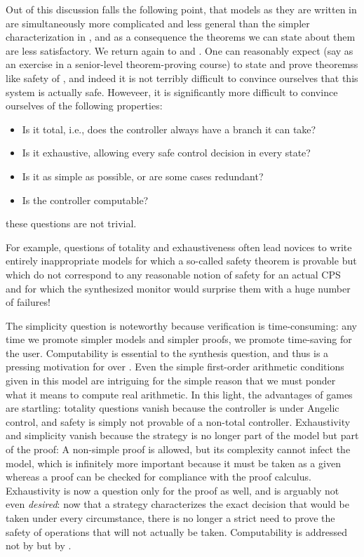 Out of this discussion falls the following point, that models as they are written in \dL are simultaneously more complicated and less general than the simpler characterization in \dGL, and as a consequence the theorems we can state about them are less satisfactory.
We return again to  and .
One can reasonably expect (say as an exercise in a senior-level theorem-proving course) to state and prove theoremss like safety of , and indeed it is not terribly difficult to convince ourselves that this system is actually safe.
Howeveer, it is significantly more difficult to convince ourselves of the following properties:
\begin{itemize}
\item Is it total, i.e., does the controller always have a branch it can take?
\item Is it exhaustive, allowing every safe control decision in every state?
\item Is it as simple as possible, or are some cases redundant?
\item Is the controller computable?
\end{itemize}
these questions are not trivial.


For example, questions of totality and exhaustiveness often lead novices to write entirely inappropriate models for which a so-called safety theorem is provable but which do not correspond to any reasonable notion of safety for an actual CPS and for which the synthesized \VeriPhy monitor would surprise them with a huge number of failures!


The simplicity question is noteworthy because verification is time-consuming: any time we promote simpler models and simpler proofs, we promote time-saving for the user.
Computability is essential to the synthesis question, and thus is a pressing motivation for \CdGL over \dGL.
Even the simple first-order arithmetic conditions given in this model are intriguing for the simple reason that we must ponder what it means to compute real arithmetic.
In this light, the advantages of games are startling: totality questions vanish because the controller is under Angelic control, and safety is simply not provable of a non-total controller.
Exhaustivity and simplicity vanish because the strategy is no longer part of the model but part of the proof: A non-simple proof is allowed, but its complexity cannot infect the model, which is infinitely more important because it must be taken as a given whereas a proof can be checked for compliance with the proof calculus.
Exhaustivity is now a question only for the proof as well, and is arguably not even \emph{desired}: now that a strategy characterizes the exact decision that would be taken under every circumstance, there is no longer a strict need to prove the safety of operations that will not actually be taken.
Computability is addressed not by \dGL but by \CdGL.

